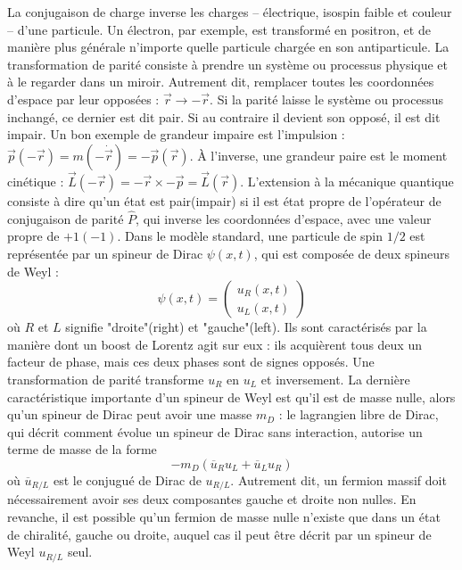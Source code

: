       La conjugaison de charge inverse les charges -- électrique, isospin faible et couleur -- d'une particule. Un électron, par exemple, est transformé en positron, et de manière plus générale n'importe quelle particule chargée en son antiparticule. La transformation de parité consiste à prendre un système ou processus physique  et à le regarder dans un miroir. Autrement dit, remplacer toutes les coordonnées d'espace par leur opposées : $\Vec{r}\to-\Vec{r}$. Si la parité laisse le système ou processus inchangé, ce dernier est dit pair. Si au contraire il devient son opposé, il est dit impair. Un bon exemple de grandeur impaire est l'impulsion : $\Vec{p}(-\Vec{r}) = m(-\dot{\Vec{r}}) = -\Vec{p}(\Vec{r})$. À l'inverse, une grandeur paire est le moment cinétique : $\Vec{L}(-\Vec{r}) = -\Vec{r}\times -\Vec{p} = \Vec{L}(\Vec{r})$. L'extension à la mécanique quantique consiste à dire qu'un état est pair(impair) si il est état propre de l'opérateur de conjugaison de parité $\hat{P}$, qui inverse les coordonnées d'espace, avec une valeur propre de $+1(-1)$. Dans le modèle standard, une particule de spin $1/2$ est représentée par un spineur de Dirac $\psi(x,t)$, qui est composée de deux spineurs de Weyl :
      \begin{equation}
        \psi(x,t)=\left(\begin{matrix} u_R(x,t) \\ u_L(x,t)\end{matrix}\right)
      \end{equation}
      où $R$ et $L$ signifie "droite"(right) et "gauche"(left). Ils sont caractérisés par la manière dont un boost de Lorentz agit sur eux : ils acquièrent tous deux un facteur de phase, mais ces deux phases sont de signes opposés. Une transformation de parité transforme $u_R$ en $u_L$ et inversement. La dernière caractéristique importante d'un spineur de Weyl est qu'il est de masse nulle, alors qu'un spineur de Dirac peut avoir une masse $m_D$ : le lagrangien libre de Dirac, qui décrit comment évolue un spineur de Dirac sans interaction, autorise un terme de masse de la forme
      \begin{equation}\label{eq::dirac_mass}
        -m_D(\overline{u}_R u_L + \overline{u}_L u_R)
      \end{equation}
      où $\overline{u}_{R/L}$ est le conjugué de Dirac de $u_{R/L}$. Autrement dit, un fermion massif doit nécessairement avoir ses deux composantes gauche et droite non nulles. En revanche, il est possible qu'un fermion de masse nulle n'existe que dans un état de chiralité, gauche ou droite, auquel cas il peut être décrit par un spineur de Weyl $u_{R/L}$ seul. 

